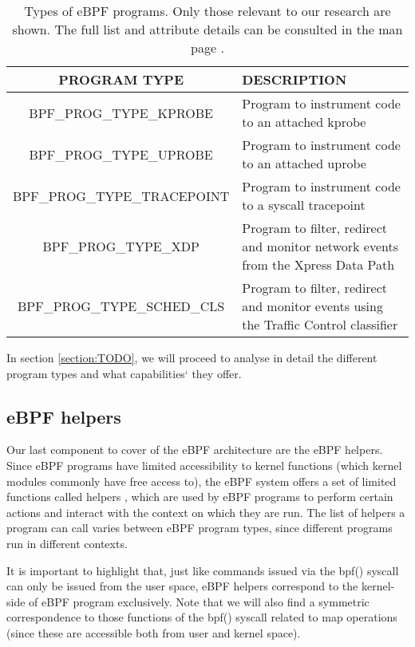 \begin{table}[htbp]
\begin{tabular}{|c|>{\centering\arraybackslash}p{5cm}|}
\hline
PROGRAM TYPE & DESCRIPTION\\
\hline
\hline
BPF\_PROG\_TYPE\_KPROBE & Program to instrument code to an attached kprobe\\
\hline
BPF\_PROG\_TYPE\_UPROBE & Program to instrument code to an attached uprobe\\
\hline
BPF\_PROG\_TYPE\_TRACEPOINT & Program to instrument code to a syscall tracepoint\\
\hline
BPF\_PROG\_TYPE\_XDP & Program to filter, redirect and monitor network events from the Xpress Data Path\\
\hline
BPF\_PROG\_TYPE\_SCHED\_CLS & Program to filter, redirect and monitor events using the Traffic Control classifier\\
\hline
\end{tabular}
\caption{Types of eBPF programs. Only those relevant to our research are shown. The full list and attribute details can be consulted in the man page \cite{bpf_syscall}.}
\label{table:ebpf_prog_types}
\end{table}

In section \ref{section:TODO}, we will proceed to analyse in detail the different program types and what capabilities` they offer.

\subsection{eBPF helpers} \label{subsection:ebpf_helpers}
Our last component to cover of the eBPF architecture are the eBPF helpers. Since eBPF programs have limited accessibility to kernel functions (which kernel modules commonly have free access to), the eBPF system offers a set of limited functions called helpers \cite{ebpf_helpers}, which are used by eBPF programs to perform certain actions and interact with the context on which they are run. The list of helpers a program can call varies between eBPF program types, since different programs run in different contexts.

It is important to highlight that, just like commands issued via the bpf() syscall can only be issued from the user space, eBPF helpers correspond to the kernel-side of eBPF program exclusively. Note that we will also find a symmetric correspondence to those functions of the bpf() syscall related to map operations (since these are accessible both from user and kernel space).

